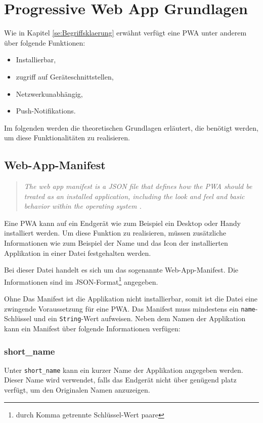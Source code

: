 
\section{Progressive Web App Grundlagen}

Wie in Kapitel \ref{se:Begriffsklaerung} erwähnt verfügt eine PWA unter anderem über folgende Funktionen: 
\begin{itemize}
    \item Installierbar,
    \item zugriff auf Geräteschnittstellen, 
    \item Netzwerkunabhängig,
    \item Push-Notifikations.
\end{itemize} 

Im folgenden werden die theoretischen Grundlagen erläutert, die benötigt werden, um diese Funktionalitäten zu realisieren. 


\subsection{Web-App-Manifest}\label{sec:webappmanifest}

\begin{quote}
   \textit{The web app manifest is a JSON file that defines how the PWA should be treated as an installed application, including the look and feel and basic behavior within the operating system \cite{Developers2022}. }
\end{quote}

Eine PWA kann auf ein Endgerät wie zum Beispiel ein Desktop oder Handy installiert werden. Um diese Funktion zu realisieren, müssen zusätzliche Informationen wie zum Beispiel der Name und das Icon der installierten Applikation in einer Datei festgehalten werden. 

Bei dieser Datei handelt es sich um das sogenannte Web-App-Manifest. Die Informationen sind im \ac{JSON}-Format\footnote{durch Komma getrennte Schlüssel-Wert paare} angegeben. 

Ohne Das Manifest ist die Applikation nicht installierbar, somit ist die Datei eine zwingende Voraussetzung für eine PWA. 
Das Manifest muss mindestens ein \texttt{name}-Schlüssel und ein \texttt{String}-Wert aufweisen. 
Neben dem Namen der Applikation kann ein Manifest über folgende Informationen verfügen: 

\subsubsection{short\_name}
Unter \texttt{short\_name} kann ein kurzer Name der Applikation angegeben werden. Dieser Name wird verwendet, falls das Endgerät nicht über genügend platz verfügt, um den Originalen Namen anzuzeigen. 

